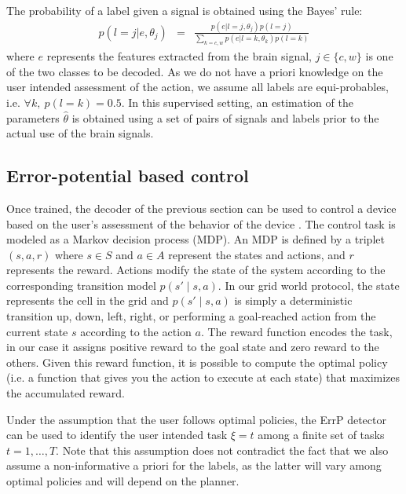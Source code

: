 The probability of a label given a signal is obtained using the Bayes' rule:
%
\begin{eqnarray}
    p(l = j|e,\theta_j) &=& \frac{p(e|l = j, \theta_j)p(l = j)}{\sum_{k = c,w}{p(e|l = k,\theta_k)p(l = k)}}
\end{eqnarray}
where $e$ represents the features extracted from the brain signal, $j\in\{c,w\}$ is one of the two classes to be decoded.
%
As we do not have a priori knowledge on the user intended assessment of the action, we assume all labels are equi-probables, i.e. $\forall k,~p(l = k) = 0.5$.
%
In this supervised setting, an estimation of the parameters $\hat{\theta}$ is obtained using a set of pairs of signals and labels prior to the actual use of the brain signals.

\subsection{Error-potential based control}
\label{sec:errpcontrol}
Once trained, the decoder of the previous section can be used to control a device based on the user's assessment of the behavior of the device \cite{iturrate13}.
%
The control task is modeled as a Markov decision process (MDP). An MDP is defined by a triplet $(s,a,r)$  where $s\in S$ and $a\in A$ represent the states and actions, and $r$ represents the reward.  Actions modify the state of the system according to the corresponding transition model $p(s'\mid s,a)$. In our grid world protocol, the state represents the cell in the grid and  $p(s'\mid s,a)$ is simply a deterministic transition up, down, left, right, or performing a goal-reached action from the current state $s$ according to the action $a$. The reward function encodes the task, in our case it assigns positive reward to the goal state and zero reward to the others. Given this reward function, it is possible to compute the optimal policy (i.e. a function that gives you the action to execute at each state) that maximizes the accumulated reward.

Under the assumption that the user follows optimal policies, the ErrP detector can be used to identify the user intended task $\xi = t$ among a finite set of tasks $t = 1,\ldots,T$. Note that this assumption does not contradict the fact that we also assume a non-informative a priori for the labels, as the latter will vary among optimal policies and will depend on the planner.

